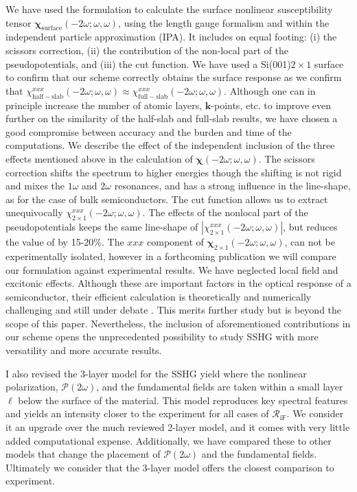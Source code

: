 We have used the formulation to calculate the surface nonlinear susceptibility
tensor $\boldsymbol{\chi}_{\mathrm{surface}}(-2\omega;\omega,\omega)$, using the
length gauge formalism and within the independent particle approximation (IPA).
It includes on equal footing: (i) the scissors correction, (ii) the contribution
of the non-local part of the pseudopotentials, and (iii) the cut function. We
have used a Si(001)$2\times 1$ surface to confirm that our scheme correctly
obtains the surface response as we confirm that
$\chi_{\mathrm{half-slab}}^{xxx}(-2\omega;\omega,\omega) \approx
\chi_{\mathrm{full-slab}}^{xxx}(-2\omega;\omega,\omega)$. Although one can in
principle increase the number of atomic layers, $\mathbf{k}$-points, etc. to
improve even further on the similarity of the half-slab and full-slab results,
we have chosen a good compromise between accuracy and the burden and time of the
computations. We describe the effect of the independent inclusion of the three
effects mentioned above in the calculation of
$\boldsymbol{\chi}(-2\omega;\omega,\omega)$. The scissors correction shifts the
spectrum to higher energies though the shifting is not rigid and mixes the
$1\omega$ and $2\omega$ resonances, and has a strong influence in the
line-shape, as for the case of bulk
semiconductors.\cite{luppiJCP10,luppiPRB10,leitsmannPRB05} The cut function
allows us to extract unequivocally $\chi^{xxx}_{2\times
1}(-2\omega;\omega,\omega)$. The effects of the nonlocal part of the
pseudopotentials keeps the same line-shape of $|\chi^{xxx}_{2\times
1}(-2\omega;\omega,\omega)|$, but reduces the value of by 15-20\%. The $xxx$
component of $\boldsymbol{\chi}_{2\times 1}(-2\omega;\omega,\omega)$, can not be
experimentally isolated, however in a forthcoming publication we will compare
our formulation against experimental results. We have neglected local field and
excitonic effects. Although these are important factors in the optical response
of a semiconductor, their efficient calculation is theoretically and numerically
challenging and still under debate \cite{beyond}. This merits further study but
is beyond the scope of this paper. Nevertheless, the inclusion of aforementioned
contributions in our scheme opens the unprecedented possibility to study SSHG
with more versatility and more accurate results.

I also revised the 3-layer model for the SSHG yield where the nonlinear
polarization, $\boldsymbol{\mathcal{P}}(2\omega)$, and the fundamental fields
are taken within a small layer $\ell$ below the surface of the material. This
model reproduces key spectral features and yields an intensity closer to the
experiment for all cases of $\mathcal{R}_{\mathrm{iF}}$. We consider it an
upgrade over the much reviewed 2-layer model\cite{mizrahiJOSA88}, and it comes
with very little added computational expense. Additionally, we have compared
these to other models that change the placement of
$\boldsymbol{\mathcal{P}}(2\omega)$ and the fundamental fields. Ultimately we
consider that the 3-layer model offers the closest comparison to experiment.

